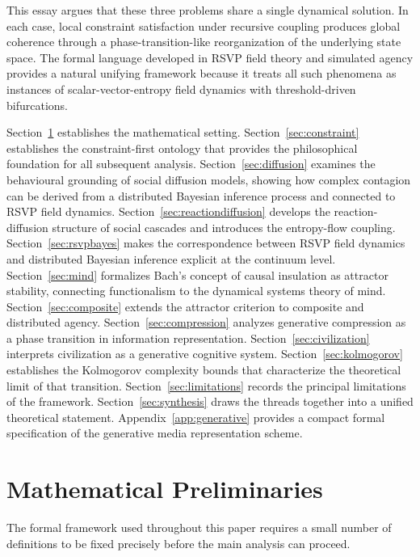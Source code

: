 \documentclass[12pt,a4paper]{article}
\theoremstyle{plain}
\theoremstyle{definition}
\begin{document}
This essay argues that these three problems share a single dynamical solution. In each case, local constraint satisfaction under recursive coupling produces global coherence through a phase-transition-like reorganization of the underlying state space. The formal language developed in RSVP field theory and simulated agency provides a natural unifying framework because it treats all such phenomena as instances of scalar-vector-entropy field dynamics with threshold-driven bifurcations.

Section~\ref{sec:prelim} establishes the mathematical setting. Section~\ref{sec:constraint} establishes the constraint-first ontology that provides the philosophical foundation for all subsequent analysis. Section~\ref{sec:diffusion} examines the behavioural grounding of social diffusion models, showing how complex contagion can be derived from a distributed Bayesian inference process and connected to RSVP field dynamics. Section~\ref{sec:reactiondiffusion} develops the reaction-diffusion structure of social cascades and introduces the entropy-flow coupling. Section~\ref{sec:rsvpbayes} makes the correspondence between RSVP field dynamics and distributed Bayesian inference explicit at the continuum level. Section~\ref{sec:mind} formalizes Bach's concept of causal insulation as attractor stability, connecting functionalism to the dynamical systems theory of mind. Section~\ref{sec:composite} extends the attractor criterion to composite and distributed agency. Section~\ref{sec:compression} analyzes generative compression as a phase transition in information representation. Section~\ref{sec:civilization} interprets civilization as a generative cognitive system. Section~\ref{sec:kolmogorov} establishes the Kolmogorov complexity bounds that characterize the theoretical limit of that transition. Section~\ref{sec:limitations} records the principal limitations of the framework. Section~\ref{sec:synthesis} draws the threads together into a unified theoretical statement. Appendix~\ref{app:generative} provides a compact formal specification of the generative media representation scheme.

\section{Mathematical Preliminaries}
\label{sec:prelim}

The formal framework used throughout this paper requires a small number of definitions to be fixed precisely before the main analysis can proceed.
\end{document}
